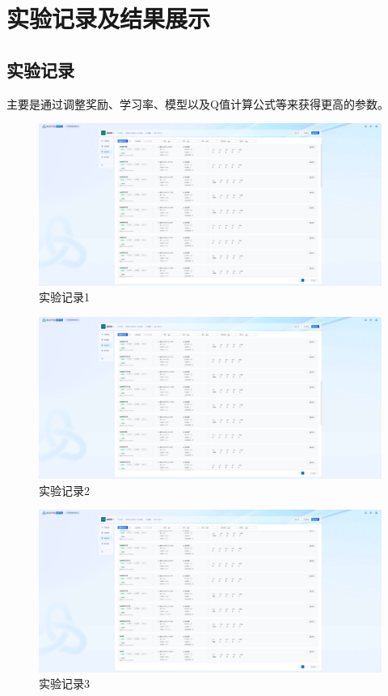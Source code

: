 \section{实验记录及结果展示}

\subsection{实验记录}
主要是通过调整奖励、学习率、模型以及Q值计算公式等来获得更高的参数。
\begin{figure}[H]
    \centering
    \includegraphics[width=0.8\linewidth]{pic/record-1.png}
    \caption{ 实验记录1}
    \label{rec-1}
\end{figure}

\begin{figure}[H]
    \centering
    \includegraphics[width=0.8\linewidth]{pic/record-2.png}
    \caption{ 实验记录2}
    \label{rec-2}
\end{figure}

\begin{figure}[H]
    \centering
    \includegraphics[width=0.8\linewidth]{pic/record-3.png}
    \caption{ 实验记录3}
    \label{rec-3}
\end{figure}



